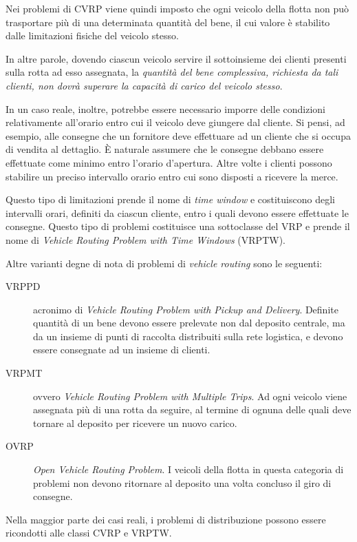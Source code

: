 Nei problemi di CVRP viene quindi imposto che ogni veicolo della flotta non può trasportare più di una determinata quantità del bene, il cui valore è stabilito dalle limitazioni fisiche del veicolo stesso.

In altre parole, dovendo ciascun veicolo servire il sottoinsieme dei clienti presenti sulla rotta ad esso assegnata, la \emph{quantità del bene complessiva, richiesta da tali clienti, non dovrà superare la capacità di carico del veicolo stesso}.

In un caso reale, inoltre, potrebbe essere necessario imporre delle condizioni relativamente all’orario entro cui il veicolo deve giungere dal cliente. Si pensi, ad esempio, alle consegne che un fornitore deve effettuare ad un cliente che si occupa di vendita al dettaglio. È naturale assumere che le consegne debbano essere effettuate come minimo entro l’orario d’apertura. Altre volte i clienti possono stabilire un preciso intervallo orario entro cui sono disposti a ricevere la merce.

Questo tipo di limitazioni prende il nome di \emph{time window} e costituiscono degli intervalli orari, definiti da ciascun cliente, entro i quali devono essere effettuate le consegne. Questo tipo di problemi costituisce una sottoclasse del VRP e prende il nome di \emph{Vehicle Routing Problem with Time Windows} (VRPTW).

Altre varianti degne di nota di problemi di \emph{vehicle routing} sono le seguenti:
\begin{description}
	\item[VRPPD] acronimo di \emph{Vehicle Routing Problem with Pickup and Delivery}. Definite quantità di un bene devono essere prelevate non dal deposito centrale, ma da un insieme di punti di raccolta distribuiti sulla rete logistica, e devono essere consegnate ad un insieme di clienti.

	\item[VRPMT] ovvero \emph{Vehicle Routing Problem with Multiple Trips}. Ad ogni veicolo viene assegnata più di una rotta da seguire, al termine di ognuna delle quali deve tornare al deposito per ricevere un nuovo carico.

	\item[OVRP] \emph{Open Vehicle Routing Problem}. I veicoli della flotta in questa categoria di problemi non devono ritornare al deposito una volta concluso il giro di consegne.
\end{description}

Nella maggior parte dei casi reali, i problemi di distribuzione possono essere ricondotti alle classi CVRP e VRPTW. 

